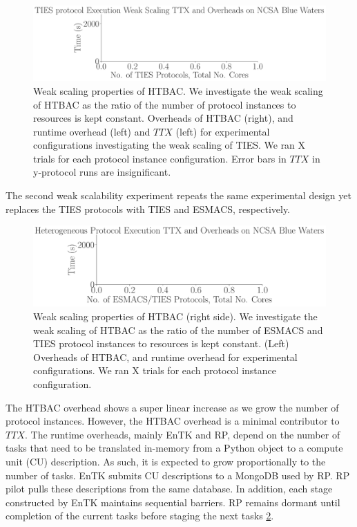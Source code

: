 \begin{figure}
  \centering
    \includegraphics[width=\columnwidth]{figures/ties_ws_pseudo.pdf}
    \caption{Weak scaling properties of HTBAC. We investigate the weak
    scaling of HTBAC as the ratio of the number of protocol instances to
    resources is kept constant. Overheads of HTBAC (right), and runtime
    overhead (left) and \(TTX\) (left) for experimental configurations
    investigating the weak scaling of TIES. We ran X trials for each protocol
    instance configuration. Error bars in \(TTX\) in y-protocol runs are
    insignificant.}
\label{fig:weak_scaling_TIES}
\end{figure}

The second weak scalability experiment repeats the same experimental design
yet replaces the TIES protocols with TIES and ESMACS, respectively.

\begin{figure}
  \centering
    \includegraphics[width=\columnwidth]{figures/esmacs_ties_ws_pseudo.pdf}
    \caption{Weak scaling properties of HTBAC (right side). We investigate
    the weak scaling of HTBAC as the ratio of the number of ESMACS and TIES
    protocol instances to resources is kept constant. (Left) Overheads of
    HTBAC, and runtime overhead for experimental configurations. We ran X
    trials for each protocol instance configuration.}
\label{fig:weak_scaling_ESMACS_TIES}
\end{figure}


The HTBAC overhead shows a super linear increase as we grow the number of
protocol instances. However, the HTBAC overhead is a minimal contributor to
\(TTX\). The runtime overheads, mainly EnTK and RP, depend on the number of
tasks that need to be translated in-memory from a Python object to a compute
unit (CU) description. As such, it is expected to grow proportionally to the
number of tasks. EnTK submits CU descriptions to a MongoDB used by RP. RP
pilot pulls these descriptions from the same database.
In addition, each stage constructed by EnTK maintains sequential barriers. RP
remains dormant until completion of the current tasks before staging the next
tasks \ref{fig:weak_scaling_ESMACS_TIES}.

